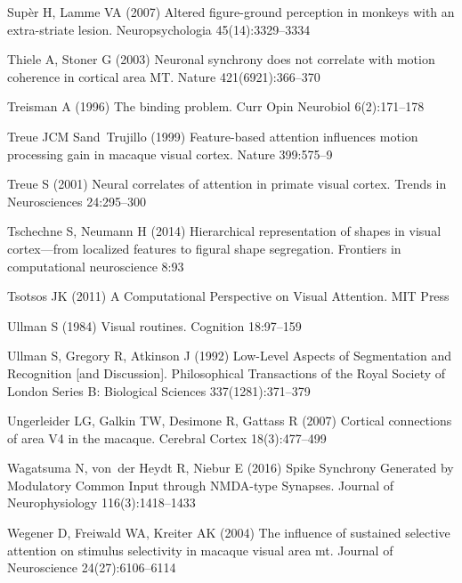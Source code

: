 \begin{thebibliography}{90}
Sup{\`e}r H, Lamme VA (2007) {A}ltered figure-ground perception in monkeys with
  an extra-striate lesion. Neuropsychologia 45(14):3329--3334

Thiele A, Stoner G (2003) {N}euronal synchrony does not correlate with motion
  coherence in cortical area {MT}. Nature 421(6921):366--370

Treisman A (1996) {T}he binding problem. Curr Opin Neurobiol 6(2):171--178

Treue JCM Sand~Trujillo (1999) {F}eature-based attention influences motion
  processing gain in macaque visual cortex. Nature 399:575--9

Treue S (2001) {N}eural correlates of attention in primate visual cortex.
  Trends in Neurosciences 24:295--300

Tschechne S, Neumann H (2014) Hierarchical representation of shapes in visual
  cortex—from localized features to figural shape segregation. Frontiers in
  computational neuroscience 8:93

Tsotsos JK (2011) A Computational Perspective on Visual Attention. MIT Press

Ullman S (1984) {V}isual routines. Cognition 18:97--159

Ullman S, Gregory R, Atkinson J (1992) {L}ow-{L}evel {A}spects of
  {S}egmentation and {R}ecognition [and {D}iscussion]. Philosophical
  Transactions of the Royal Society of London Series B: Biological Sciences
  337(1281):371--379

Ungerleider LG, Galkin TW, Desimone R, Gattass R (2007) {C}ortical connections
  of area {V}4 in the macaque. Cerebral Cortex 18(3):477--499

Wagatsuma N, von~der Heydt R, Niebur E (2016) {S}pike {S}ynchrony {G}enerated
  by {M}odulatory {C}ommon {I}nput through {NMDA}-type {S}ynapses. Journal of
  Neurophysiology 116(3):1418--1433

Wegener D, Freiwald WA, Kreiter AK (2004) The influence of sustained selective
  attention on stimulus selectivity in macaque visual area mt. Journal of
  Neuroscience 24(27):6106--6114


\end{thebibliography}

